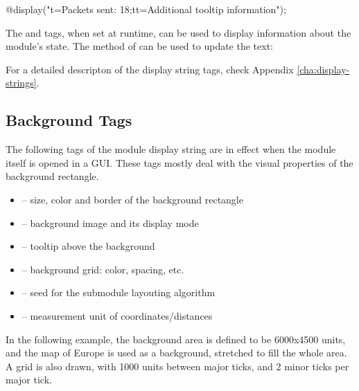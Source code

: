 \begin{ned}
@display("t=Packets sent: 18;tt=Additional tooltip information");
\end{ned}

\begin{center}
\end{center}

\begin{note}
  The  and  tags, when set at runtime, can be used to display
  information about the module's state. The  method
  of  can be used to update the text:
\end{note}

For a detailed descripton of the display string tags, check
Appendix \ref{cha:display-strings}.


\subsection{Background Tags}
\label{sec:graphics:background-displaystring-tags}

The following tags of the module display string are in effect when the
module itself is opened in a GUI. These tags mostly deal with the visual
properties of the background rectangle.

\begin{itemize}
  \item {} -- size, color and border of the background rectangle
  \item {} -- background image and its display mode
  \item {} -- tooltip above the background
  \item {} -- background grid: color, spacing, etc.
  \item {} -- seed for the submodule layouting algorithm
  \item {} -- measurement unit of coordinates/distances
\end{itemize}

In the following example, the background area is defined to be 6000x4500
units, and the map of Europe is used as a background, stretched to fill the
whole area. A grid is also drawn, with 1000 units between major ticks,
and 2 minor ticks per major tick.

\begin{ned}
network EuropePlayground
{
    @display("bgb=6000,4500;bgi=maps/europe,s;bgg=1000,2,grey95;bgu=km");
\end{ned}


